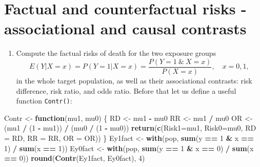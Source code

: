 \documentclass[
]{book}
\newenvironment{Shaded}{\begin{snugshade}}{\end{snugshade}}
\newcommand{\AttributeTok}[1]{\textcolor[rgb]{0.13,0.29,0.53}{#1}}
\newcommand{\ControlFlowTok}[1]{\textcolor[rgb]{0.13,0.29,0.53}{\textbf{#1}}}
\newcommand{\DecValTok}[1]{\textcolor[rgb]{0.00,0.00,0.81}{#1}}
\newcommand{\FunctionTok}[1]{\textcolor[rgb]{0.13,0.29,0.53}{\textbf{#1}}}
\newcommand{\NormalTok}[1]{#1}
\newcommand{\OtherTok}[1]{\textcolor[rgb]{0.56,0.35,0.01}{#1}}
\newcommand{\SpecialCharTok}[1]{\textcolor[rgb]{0.81,0.36,0.00}{\textbf{#1}}}
\providecommand{\tightlist}{%
  \setlength{\itemsep}{0pt}\setlength{\parskip}{0pt}}
\theoremstyle{definition}
\theoremstyle{definition}
\theoremstyle{definition}
\theoremstyle{definition}
\theoremstyle{remark}
\begin{document}
\section{Factual and counterfactual risks - associational and causal contrasts}\label{factual-and-counterfactual-risks---associational-and-causal-contrasts}

\begin{enumerate}
\def\labelenumi{\arabic{enumi}.}
\tightlist
\item
  Compute the factual risks of death for the two exposure groups
  \[ E(Y|X=x) = P(Y=1|X=x) = \frac{P(Y=1\ \&\ X=x)}{P(X=x)},
  \quad x=0,1, \]
  in the whole target population, as well as their
  associational contrasts: risk difference, risk ratio, and odds
  ratio. Before that let us define a useful function \texttt{Contr()}:
\end{enumerate}

\begin{Shaded}
\begin{Highlighting}[]
\NormalTok{Contr }\OtherTok{\textless{}{-}} \ControlFlowTok{function}\NormalTok{(mu1, mu0) \{}
\NormalTok{  RD }\OtherTok{\textless{}{-}}\NormalTok{ mu1 }\SpecialCharTok{{-}}\NormalTok{ mu0}
\NormalTok{  RR }\OtherTok{\textless{}{-}}\NormalTok{ mu1 }\SpecialCharTok{/}\NormalTok{ mu0}
\NormalTok{  OR }\OtherTok{\textless{}{-}}\NormalTok{ (mu1 }\SpecialCharTok{/}\NormalTok{ (}\DecValTok{1} \SpecialCharTok{{-}}\NormalTok{ mu1)) }\SpecialCharTok{/}\NormalTok{ (mu0 }\SpecialCharTok{/}\NormalTok{ (}\DecValTok{1} \SpecialCharTok{{-}}\NormalTok{ mu0))}
  \FunctionTok{return}\NormalTok{(}\FunctionTok{c}\NormalTok{(}\AttributeTok{Risk1=}\NormalTok{mu1, }\AttributeTok{Risk0=}\NormalTok{mu0, }\AttributeTok{RD =}\NormalTok{ RD, }\AttributeTok{RR =}\NormalTok{ RR, }\AttributeTok{OR =}\NormalTok{ OR))}
\NormalTok{\}}
\NormalTok{Ey1fact }\OtherTok{\textless{}{-}} \FunctionTok{with}\NormalTok{(pop, }\FunctionTok{sum}\NormalTok{(y }\SpecialCharTok{==} \DecValTok{1} \SpecialCharTok{\&}\NormalTok{ x }\SpecialCharTok{==} \DecValTok{1}\NormalTok{) }\SpecialCharTok{/} \FunctionTok{sum}\NormalTok{(x }\SpecialCharTok{==} \DecValTok{1}\NormalTok{))}
\NormalTok{Ey0fact }\OtherTok{\textless{}{-}} \FunctionTok{with}\NormalTok{(pop, }\FunctionTok{sum}\NormalTok{(y }\SpecialCharTok{==} \DecValTok{1} \SpecialCharTok{\&}\NormalTok{ x }\SpecialCharTok{==} \DecValTok{0}\NormalTok{) }\SpecialCharTok{/} \FunctionTok{sum}\NormalTok{(x }\SpecialCharTok{==} \DecValTok{0}\NormalTok{))}
\FunctionTok{round}\NormalTok{(}\FunctionTok{Contr}\NormalTok{(Ey1fact, Ey0fact), }\DecValTok{4}\NormalTok{)}
\end{Highlighting}
\end{Shaded}
\end{document}
